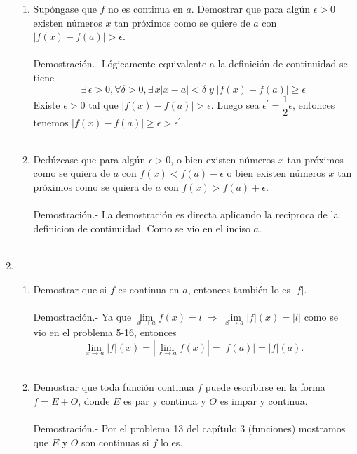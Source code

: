 \begin{enumerate}
\begin{enumerate}[\bfseries (a)]
    \item Supóngase que $f$ no es continua en $a$. Demostrar que para algún $\epsilon>0$ existen números $x$ tan próximos como se quiere de $a$ con $|f(x)-f(a)|>\epsilon$.\\\\
	Demostración.-\; Lógicamente equivalente a la definición de continuidad se tiene 
	$$\exists\,\epsilon>0, \forall \delta>0, \exists\, x |x-a|<\delta \; y \; |f(x)-f(a)|\geq \epsilon$$
	Existe $\epsilon > 0$ tal que $|f(x)-f(a)|>\epsilon$. Luego sea $\epsilon^{'}=\dfrac{1}{2}\epsilon$, entonces tenemos $|f(x)-f(a)|\geq \epsilon > \epsilon^{'}.$\\\\

    \item Dedúzcase que para algún $\epsilon>0$, o bien existen números $x$ tan próximos como se quiera de $a$ con $f(x)<f(a)-\epsilon$ o bien existen números $x$ tan próximos como se quiera de $a$ con $f(x)>f(a)+\epsilon$.\\\\
	Demostración.-\; La demostración es directa aplicando la reciproca de la definicion de continuidad. Como se vio en el inciso $a$.\\\\

\end{enumerate}

\item 
\begin{enumerate}[\bfseries (a)]

    \item Demostrar que si $f$ es continua en $a$, entonces también lo es $|f|$.\\\\
	Demostración.-\; Ya que $\lim\limits_{x\to a} f(x) = l \; \Longrightarrow \; \lim\limits_{x\to a} |f|(x) = |l|$ como se vio en el problema 5-16, entonces 
	$$\lim_{x\to a} |f|(x) = \left|\lim_{x\to a} f(x)\right| = |f(a)| = |f|(a).$$\\

    \item Demostrar que toda función continua $f$ puede escribirse en la forma $f=E+O$, donde $E$ es par y continua y $O$ es impar y continua.\\\\
	Demostración.-\; Por el problema 13 del capítulo 3 (funciones) mostramos que $E$ y $O$ son continuas si $f$ lo es.\\\\


\end{enumerate}
\end{enumerate}

